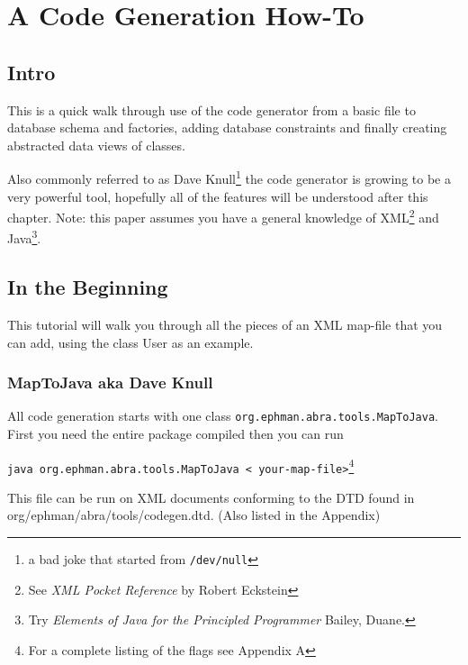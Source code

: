 \documentclass[10pt,openany]{book}
\begin{document}
\chapter{A Code Generation How-To}
\section{Intro}
This is a quick walk through use of the code generator from a basic
file to database schema and factories, adding database constraints and
finally creating abstracted data views of classes.


Also commonly referred to as Dave Knull\footnote{a bad joke that started from \texttt{/dev/null}}
the code generator is growing to be a very powerful tool, hopefully
all of the features will be understood after this chapter.
Note: this paper assumes you have a general knowledge of
XML\footnote{See \textit{XML Pocket Reference} by Robert Eckstein} and
Java\footnote{Try \textit{Elements of Java for the Principled Programmer} Bailey,
Duane.}.

\section{In the Beginning}
This tutorial will walk you through all the pieces of an XML map-file
that you can add, using the class User as an example.

\subsection{MapToJava aka Dave Knull}
All code generation starts with one class \texttt{org.ephman.abra.tools.MapToJava}.
First you need the entire package compiled then you can
run
\begin{description}
\item \texttt{java org.ephman.abra.tools.MapToJava \textless
your-map-file\textgreater}\footnote{For a complete listing of the flags
see Appendix A}
\end{description}
This file can be run on XML documents conforming to the DTD found in
org/ephman/abra/tools/codegen.dtd. (Also listed in the Appendix)
\end{document}

